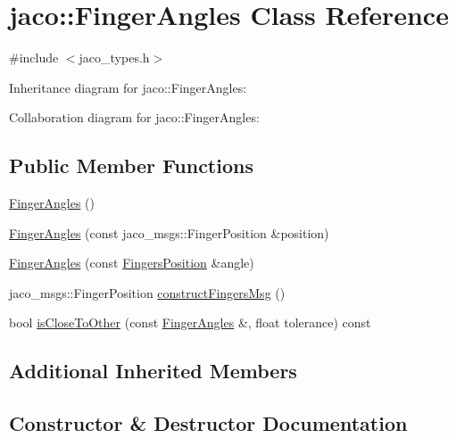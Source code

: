 \hypertarget{classjaco_1_1_finger_angles}{}\section{jaco\+:\+:Finger\+Angles Class Reference}
\label{classjaco_1_1_finger_angles}


{\ttfamily \#include $<$jaco\+\_\+types.\+h$>$}



Inheritance diagram for jaco\+:\+:Finger\+Angles\+:


Collaboration diagram for jaco\+:\+:Finger\+Angles\+:
\subsection*{Public Member Functions}
\begin{DoxyCompactItemize}
\item 
\hyperlink{classjaco_1_1_finger_angles_a7fab91acaaa9865fd50980053bf21788}{Finger\+Angles} ()
\item 
\hyperlink{classjaco_1_1_finger_angles_a6a5ffbe70cd136c7feef97ee6748577a}{Finger\+Angles} (const jaco\+\_\+msgs\+::\+Finger\+Position \&position)
\item 
\hyperlink{classjaco_1_1_finger_angles_aba8b42d3e90e791a7b50f2b753be8542}{Finger\+Angles} (const \hyperlink{struct_fingers_position}{Fingers\+Position} \&angle)
\item 
jaco\+\_\+msgs\+::\+Finger\+Position \hyperlink{classjaco_1_1_finger_angles_afe84a9beae8b4a0617ace657d7608a49}{construct\+Fingers\+Msg} ()
\item 
bool \hyperlink{classjaco_1_1_finger_angles_a1fb3bd563983bbe24350e89a6b96e715}{is\+Close\+To\+Other} (const \hyperlink{classjaco_1_1_finger_angles}{Finger\+Angles} \&, float tolerance) const 
\end{DoxyCompactItemize}
\subsection*{Additional Inherited Members}


\subsection{Constructor \& Destructor Documentation}

